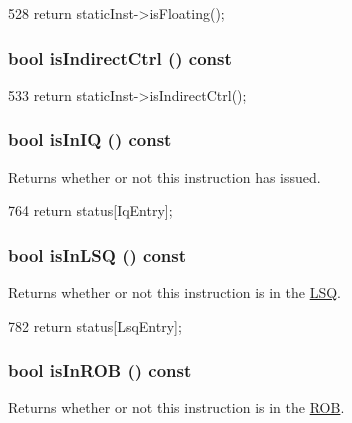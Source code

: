 \begin{DoxyCode}
528 { return staticInst->isFloating(); }
\end{DoxyCode}
\hypertarget{classBaseDynInst_a5dfa427a48589c4c910416a67808510f}{
\subsubsection[{isIndirectCtrl}]{\setlength{\rightskip}{0pt plus 5cm}bool isIndirectCtrl () const}}
\label{classBaseDynInst_a5dfa427a48589c4c910416a67808510f}



\begin{DoxyCode}
533 { return staticInst->isIndirectCtrl(); }
\end{DoxyCode}
\hypertarget{classBaseDynInst_a2edaf88f1e5d97e6785e1f17819bed40}{
\subsubsection[{isInIQ}]{\setlength{\rightskip}{0pt plus 5cm}bool isInIQ () const}}
\label{classBaseDynInst_a2edaf88f1e5d97e6785e1f17819bed40}
Returns whether or not this instruction has issued. 


\begin{DoxyCode}
764 { return status[IqEntry]; }
\end{DoxyCode}
\hypertarget{classBaseDynInst_ab1c7907423921c684177bb65bde913c2}{
\subsubsection[{isInLSQ}]{\setlength{\rightskip}{0pt plus 5cm}bool isInLSQ () const}}
\label{classBaseDynInst_ab1c7907423921c684177bb65bde913c2}
Returns whether or not this instruction is in the \hyperlink{classLSQ}{LSQ}. 


\begin{DoxyCode}
782 { return status[LsqEntry]; }
\end{DoxyCode}
\hypertarget{classBaseDynInst_adc220257dd64e1af706d033eb74c9150}{
\subsubsection[{isInROB}]{\setlength{\rightskip}{0pt plus 5cm}bool isInROB () const}}
\label{classBaseDynInst_adc220257dd64e1af706d033eb74c9150}
Returns whether or not this instruction is in the \hyperlink{classROB}{ROB}. 


